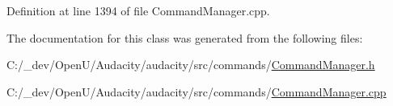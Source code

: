 Definition at line 1394 of file Command\+Manager.\+cpp.



The documentation for this class was generated from the following files\+:\begin{DoxyCompactItemize}
\item 
C\+:/\+\_\+dev/\+Open\+U/\+Audacity/audacity/src/commands/\hyperlink{_command_manager_8h}{Command\+Manager.\+h}\item 
C\+:/\+\_\+dev/\+Open\+U/\+Audacity/audacity/src/commands/\hyperlink{_command_manager_8cpp}{Command\+Manager.\+cpp}\end{DoxyCompactItemize}
